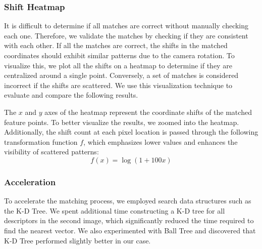 \subsubsection{Shift Heatmap}

It is difficult to determine if all matches are correct without manually 
checking each one. Therefore, we validate the matches by checking if they are 
consistent with each other. If all the matches are correct, the shifts in the 
matched coordinates should exhibit similar patterns due to the camera rotation. 
To visualize this, we plot all the shifts on a heatmap to determine if they are 
centralized around a single point. Conversely, a set of matches is considered 
incorrect if the shifts are scattered. We use this visualization technique to 
evaluate and compare the following results.

The $x$ and $y$ axes of the heatmap represent the coordinate shifts of the 
matched feature points. To better visualize the results, we zoomed into the 
heatmap. Additionally, the shift count at each pixel location is passed through 
the following transformation function $f$, which emphasizes lower values and 
enhances the visibility of scattered patterns:
$$
    f(x) = \log(1+100x)
$$

\subsubsection{Acceleration}

To accelerate the matching process, we employed search data structures such as 
the K-D Tree. We spent additional time constructing a K-D tree for all 
descriptors in the second image, which significantly reduced the time required 
to find the nearest vector. We also experimented with Ball Tree and discovered 
that K-D Tree performed slightly better in our case. 

